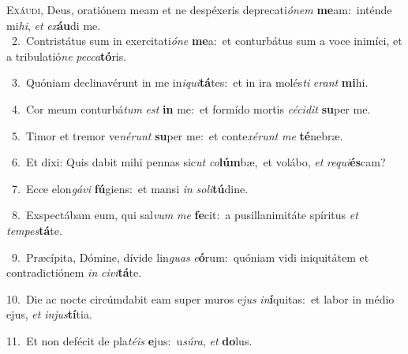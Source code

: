 \lettrine{\initial\textcolor{\initialcolor}{E}}{xáudi,} Deus, oratiónem meam et ne despéxeris deprecati\-\textit{ó}\-\textit{nem} \textbf{me}\-am:~\star inténde mi\-\textit{hi}\-, \textit{et} \textit{ex}\-\textbf{áu}di me.\\
{\numbfont\textcolor{\numbcolor}{~2.}}~Contristátus sum in exercitati\-\textit{ó}\-\textit{ne} \textbf{me}\-a:~\star et conturbátus sum a voce inimíci, et a tribulatió\textit{ne} \textit{pec}\-\textit{ca}\textbf{tó}ris.\par
{\numbfont\textcolor{\numbcolor}{~3.}}~Quóniam declinavérunt in me in\-\textit{i}\-\textit{qui}\textbf{tá}tes:~\star et in ira molés\textit{ti} \textit{e}\-\textit{rant} \textbf{mi}\-hi.\par
{\numbfont\textcolor{\numbcolor}{~4.}}~Cor meum conturbá\textit{tum} \textit{est} \textbf{in} me:~\star et formído mortis \textit{cé}\-\textit{ci}\textit{dit} \textbf{su}\-per me.\par
{\numbfont\textcolor{\numbcolor}{~5.}}~Timor et tremor ve\-\textit{né}\-\textit{runt} \textbf{su}\-per me:~\star et conte\-\textit{xé}\-\textit{runt} \textit{me} \textbf{té}\-nebræ.\par
{\numbfont\textcolor{\numbcolor}{~6.}}~Et dixi: Quis dabit mihi pennas sic\textit{ut} \textit{co}\-\textbf{lúm}bæ,~\star et volábo, \textit{et} \textit{re}\-\textit{qui}\textbf{és}cam?\par
{\numbfont\textcolor{\numbcolor}{~7.}}~Ecce elon\-\textit{gá}\-\textit{vi} \textbf{fú}\-giens:~\star et mansi \textit{in} \textit{so}\-\textit{li}\textbf{tú}dine.\par
{\numbfont\textcolor{\numbcolor}{~8.}}~Exspectábam eum, qui sal\textit{vum} \textit{me} \textbf{fe}\-cit:~\star a pusillanimitáte spíritus \textit{et} \textit{tem}\-\textit{pes}\textbf{tá}te.\par
{\numbfont\textcolor{\numbcolor}{~9.}}~Præcípita, Dómine, dívide lin\textit{guas} \textit{e}\-\textbf{ó}rum:~\star quóniam vidi iniquitátem et contradictiónem \textit{in} \textit{ci}\-\textit{vi}\textbf{tá}te.\par
{\numbfont\textcolor{\numbcolor}{10.}}~Die ac nocte circúmdabit eam super muros e\textit{jus} \textit{in}\-\textbf{í}quitas:~\star et labor in médio ejus, \textit{et} \textit{in}\-\textit{jus}\textbf{tí}tia.\par
{\numbfont\textcolor{\numbcolor}{11.}}~Et non defécit de pla\-\textit{té}\-\textit{is} \textbf{e}\-jus:~\star u\-\textit{sú}\-\textit{ra}, \textit{et} \textbf{do}\-lus.\par
